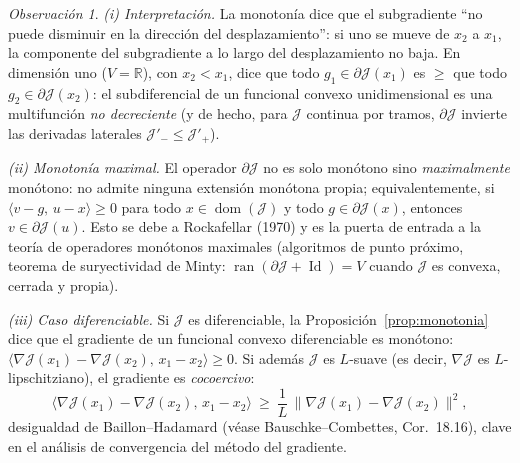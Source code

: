 \documentclass[12pt]{book}
\newtheorem{proposition}{Proposición}
\theoremstyle{definition}
\theoremstyle{plain}
\theoremstyle{remark}
\newtheorem{observacion}{Observación}[section]
\begin{document}
\begin{observacion}
\label{obs:monotonia}
\emph{(i) Interpretaci\'on.} La monoton\'ia dice que el subgradiente
``no puede disminuir en la direcci\'on del desplazamiento'': si uno se
mueve de $x_{2}$ a $x_{1}$, la componente del subgradiente a lo largo
del desplazamiento no baja. En dimensi\'on uno ($V=\mathbb{R}$), con
$x_{2}<x_{1}$, dice que todo $g_{1}\in\partial\mathcal{J}(x_{1})$ es
$\ge$ que todo $g_{2}\in\partial\mathcal{J}(x_{2})$: el subdiferencial
de un funcional convexo unidimensional es una multifunci\'on \emph{no
decreciente} (y de hecho, para $\mathcal{J}$ continua por tramos,
$\partial\mathcal{J}$ invierte las derivadas laterales
$\mathcal{J}'_{-}\le\mathcal{J}'_{+}$).

\smallskip
\emph{(ii) Monoton\'ia maximal.} El operador
$\partial\mathcal{J}$ no es solo mon\'otono sino \emph{maximalmente}
mon\'otono: no admite ninguna extensi\'on mon\'otona propia;
equivalentemente, si
$\langle v-g,\,u-x\rangle\ge0$ para todo
$x\in\operatorname{dom}(\mathcal{J})$ y todo
$g\in\partial\mathcal{J}(x)$, entonces
$v\in\partial\mathcal{J}(u)$. Esto se debe a Rockafellar (1970) y es la
puerta de entrada a la teor\'ia de operadores mon\'otonos maximales
(algoritmos de punto pr\'oximo, teorema de suryectividad de Minty:
$\operatorname{ran}(\partial\mathcal{J}+\operatorname{Id})=V$ cuando
$\mathcal{J}$ es convexa, cerrada y propia).

\smallskip
\emph{(iii) Caso diferenciable.} Si $\mathcal{J}$ es diferenciable, la
Proposici\'on~\ref{prop:monotonia} dice que el gradiente de un funcional
convexo diferenciable es mon\'otono:
$\langle\nabla\mathcal{J}(x_{1})-\nabla\mathcal{J}(x_{2}),
\,x_{1}-x_{2}\rangle\ge0$. Si adem\'as $\mathcal{J}$ es $L$-suave (es
decir, $\nabla\mathcal{J}$ es $L$-lipschitziano), el gradiente es
\emph{cocoercivo}:
\[
\langle\nabla\mathcal{J}(x_{1})-\nabla\mathcal{J}(x_{2}),
\,x_{1}-x_{2}\rangle
\ \ge\ \frac{1}{L}\,
\bigl\|\nabla\mathcal{J}(x_{1})-\nabla\mathcal{J}(x_{2})\bigr\|^{2},
\]
desigualdad de Baillon--Hadamard (v\'ease Bauschke--Combettes,
Cor.~18.16), clave en el an\'alisis de convergencia del m\'etodo del
gradiente.
\end{observacion}

\end{document}
